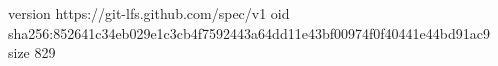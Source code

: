 version https://git-lfs.github.com/spec/v1
oid sha256:852641c34eb029e1c3cb4f7592443a64dd11e43bf00974f0f40441e44bd91ac9
size 829
